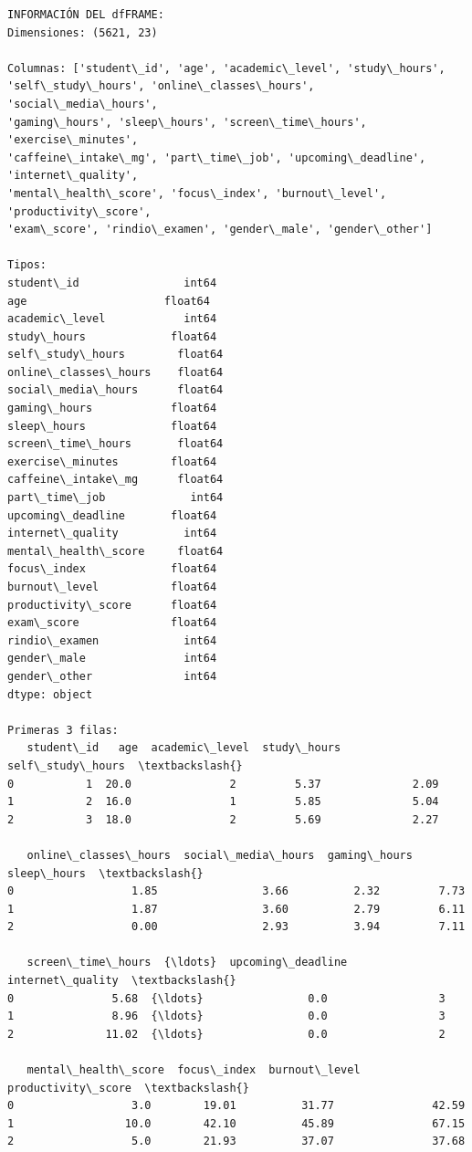 \documentclass[11pt]{article}
\begin{document}
    \begin{Verbatim}[commandchars=\\\{\}]
INFORMACIÓN DEL dfFRAME:
Dimensiones: (5621, 23)

Columnas: ['student\_id', 'age', 'academic\_level', 'study\_hours',
'self\_study\_hours', 'online\_classes\_hours', 'social\_media\_hours',
'gaming\_hours', 'sleep\_hours', 'screen\_time\_hours', 'exercise\_minutes',
'caffeine\_intake\_mg', 'part\_time\_job', 'upcoming\_deadline', 'internet\_quality',
'mental\_health\_score', 'focus\_index', 'burnout\_level', 'productivity\_score',
'exam\_score', 'rindio\_examen', 'gender\_male', 'gender\_other']

Tipos:
student\_id                int64
age                     float64
academic\_level            int64
study\_hours             float64
self\_study\_hours        float64
online\_classes\_hours    float64
social\_media\_hours      float64
gaming\_hours            float64
sleep\_hours             float64
screen\_time\_hours       float64
exercise\_minutes        float64
caffeine\_intake\_mg      float64
part\_time\_job             int64
upcoming\_deadline       float64
internet\_quality          int64
mental\_health\_score     float64
focus\_index             float64
burnout\_level           float64
productivity\_score      float64
exam\_score              float64
rindio\_examen             int64
gender\_male               int64
gender\_other              int64
dtype: object

Primeras 3 filas:
   student\_id   age  academic\_level  study\_hours  self\_study\_hours  \textbackslash{}
0           1  20.0               2         5.37              2.09
1           2  16.0               1         5.85              5.04
2           3  18.0               2         5.69              2.27

   online\_classes\_hours  social\_media\_hours  gaming\_hours  sleep\_hours  \textbackslash{}
0                  1.85                3.66          2.32         7.73
1                  1.87                3.60          2.79         6.11
2                  0.00                2.93          3.94         7.11

   screen\_time\_hours  {\ldots}  upcoming\_deadline  internet\_quality  \textbackslash{}
0               5.68  {\ldots}                0.0                 3
1               8.96  {\ldots}                0.0                 3
2              11.02  {\ldots}                0.0                 2

   mental\_health\_score  focus\_index  burnout\_level  productivity\_score  \textbackslash{}
0                  3.0        19.01          31.77               42.59
1                 10.0        42.10          45.89               67.15
2                  5.0        21.93          37.07               37.68


\end{Verbatim}
\end{document}
